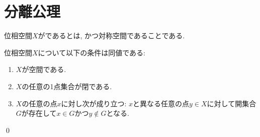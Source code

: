\documentclass[uplatex, dvipdfmx, a4paper, 12pt, class=jsbook, crop=false]{standalone}
\begin{document}
\section{分離公理}
\label{sec:T0-spaces}

\begin{definition}
	位相空間$ X $がであるとは, かつ対称空間であることである.
\end{definition}

\begin{proposition}
	位相空間$ X $について以下の条件は同値である:
	\begin{enumerate}
		\item $ X $が空間である.
		\item $ X $の任意の1点集合が閉である.
		\item $ X $の任意の点$ x $に対し次が成り立つ: $ x $と異なる任意の点$ y \in X $に対して開集合$ G $が存在して$ x \in G $かつ$ y \not\in G $となる.
	\end{enumerate}
	\qed
\end{proposition}
\end{document}
